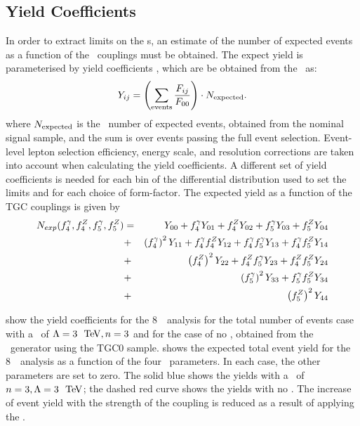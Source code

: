 \subsection{Yield Coefficients}

In order to extract limits on the \TGC s, an estimate of the number of expected events as a
function of the \TGC\ couplings must be obtained. The expect yield is parameterised by
yield coefficients \Yij, which are be obtained from the \Fij\ as:
\begin{equation}
Y_{ij} = \left( \sum_{\rm events} \frac{F_{ij}}{F_{00} } \right) \cdot{N_{\rm expected}}.
\end{equation}
where $N_{\rm expected}$ is the \sm\ number of expected events, obtained from the
nominal signal sample, and the sum is over events passing the full event
selection. Event-level lepton selection efficiency, energy scale, and resolution corrections
are taken into account when calculating the yield coefficients. A different set of yield
coefficients is needed for each bin of the differential distribution used to set
the limits and for each choice of
form-factor. The expected yield as a function of the TGC couplings is given by
\begin{eqnarray}\label{eqn:Nexp_TGC}
N_{exp} (f_{4}^{\gamma}, f_{4}^{Z}, f_{5}^{\gamma}, f_{5}^{Z}) & = & Y_{00} + f_4^\gamma Y_{01} + f_4^Z Y_{02} + f_5^\gamma Y_{03} + f_5^Z Y_{04}  \nonumber \\
&+& \left(f_4^\gamma\right)^2Y_{11} + f_4^\gamma f_4^Z Y_{12} +  f_4^\gamma f_5^\gamma Y_{13} + f_4^\gamma f_5^Z Y_{14}  \nonumber \\
&+& \left(f_4^Z\right)^2Y_{22} + f_4^Zf_5^\gamma Y_{23} + f_4^Zf_5^Z Y_{24}  \nonumber \\
&+& \left(f_5^\gamma\right)^2Y_{33} + f_5^\gamma f_5^Z Y_{34} \nonumber \\
&+& \left(f_5^Z\right)^2Y_{44}
\end{eqnarray}

 show the yield
coefficients for the 8~\tev\ analysis for the total number of events case with a
\formfactor\ of $\Lambda=3~\tev, n=3$ and for the case of no \formfactor,
obtained from the \BR\ generator using the TGC0 sample.  
shows the expected total event yield for the 8~\tev\ analysis as a function of
the four \TGC\ parameters. In each case, the other parameters are set to zero.
The solid blue shows the yields with a \formfactor\ of $n=3, \Lambda=3~\tev$;
the dashed red curve shows the yields with no \formfactor. The increase of event
yield with the strength of the coupling is reduced as a result of applying the
\formfactor.

